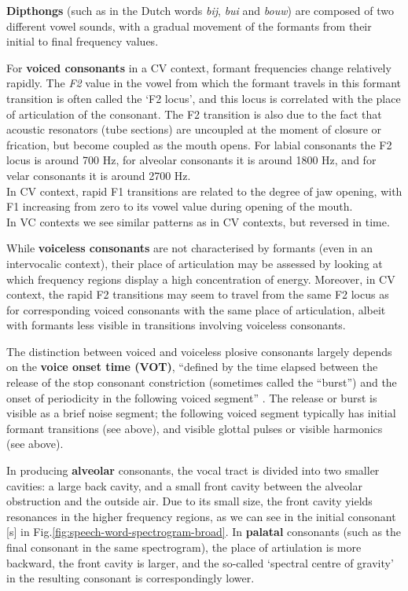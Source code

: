 \documentclass[
]{book}
\begin{document}
\textbf{Dipthongs} (such as in the Dutch words \emph{bij}, \emph{bui} and \emph{bouw}) are composed of two different vowel sounds, with a gradual movement of the formants from their initial to final frequency values.

For \textbf{voiced consonants} in a CV context, formant frequencies change relatively rapidly. The \emph{F2} value in the vowel from which the formant travels in this formant transition is often called the `F2 locus', and this locus is correlated with the place of articulation of the consonant. The F2 transition is also due to the fact that acoustic resonators (tube sections) are uncoupled at the moment of closure or frication, but become coupled as the mouth opens.
For labial consonants the F2 locus is around 700 Hz, for alveolar consonants it is around 1800 Hz, and for velar consonants it is around 2700 Hz.\\
In CV context, rapid F1 transitions are related to the degree of jaw opening, with F1 increasing from zero to its vowel value during opening of the mouth.\\
In VC contexts we see similar patterns as in CV contexts, but reversed in time.

While \textbf{voiceless consonants} are not characterised by formants (even in an intervocalic context), their place of articulation may be assessed by looking at which frequency regions display a high concentration of energy. Moreover, in CV context, the rapid F2 transitions may seem to travel from the same F2 locus as for corresponding voiced consonants with the same place of articulation, albeit with formants less visible in transitions involving voiceless consonants.

The distinction between voiced and voiceless plosive consonants largely depends on the \textbf{voice onset time (VOT)}, ``defined by the time elapsed between the release of the stop consonant constriction (sometimes called the ``burst'') and the onset of periodicity in the following voiced segment'' \citep{Rubin_2022}. The release or burst is visible as a brief noise segment; the following voiced segment typically has initial formant transitions (see above), and visible glottal pulses or visible harmonics (see above).

In producing \textbf{alveolar} consonants, the vocal tract is divided into two smaller cavities: a large back cavity, and a small front cavity between the alveolar obstruction and the outside air. Due to its small size, the front cavity yields resonances in the higher frequency regions, as we can see in the initial consonant {[}s{]} in Fig.\ref{fig:speech-word-spectrogram-broad}. In \textbf{palatal} consonants (such as the final consonant in the same spectrogram), the place of artiulation is more backward, the front cavity is larger, and the so-called `spectral centre of gravity' in the resulting consonant is correspondingly lower.
\end{document}
